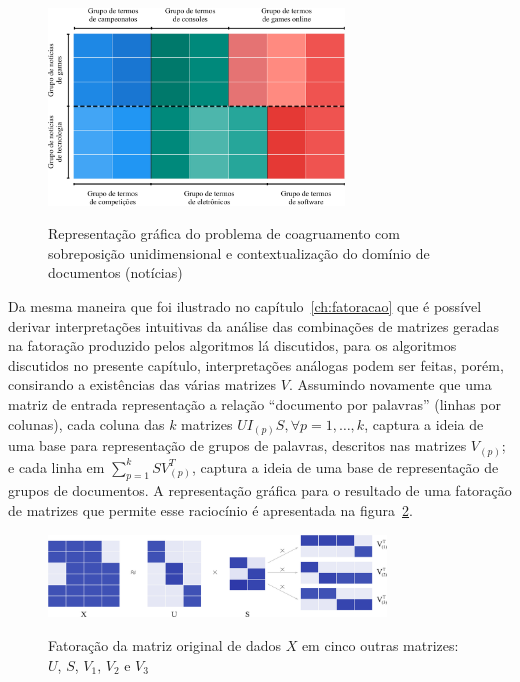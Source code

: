 \documentclass[
    12pt,                %
    oneside,            %
    a4paper,            %
    english,            %
    brazil                %
    ]{abntex2ppgsi}
\begin{document}

\begin{figure}[H]
\centering
\caption{Representação gráfica do problema de coagruamento com sobreposição unidimensional e contextualização do domínio de documentos (notícias)}
\includegraphics[width=0.7\textwidth]{img/ovnmtfNewsApplication.png}
\label{fig:ovnmtfApplication}
\end{figure}

Da mesma maneira que foi ilustrado no capítulo~\ref{ch:fatoracao} que é possível derivar interpretações intuitivas da análise das combinações de matrizes geradas na fatoração produzido pelos algoritmos lá discutidos, para os algoritmos discutidos no presente capítulo, interpretações análogas podem ser feitas, porém, consirando a existências das várias matrizes $V$.
Assumindo novamente que uma matriz de entrada representação a relação ``documento por palavras'' (linhas por colunas), cada coluna das $k$ matrizes $U I_{(p)} S, \forall p = {1, \dots, k}$, captura a ideia de uma base para representação de grupos de palavras, descritos nas matrizes $V_{(p)}$; e cada linha em $\sum_{p=1}^k S V_{(p)}^T$, captura a ideia de uma base de representação de grupos de documentos.
A representação gráfica para o resultado de uma fatoração de matrizes que permite esse raciocínio é apresentada na figura~\ref{fig:factorizationXUSV1tok}.

\begin{figure}[H]
\centering
\caption{
Fatoração da matriz original de dados $X$ em cinco outras matrizes: $U$, $S$, $V_1$, $V_2$ e $V_3$}
\includegraphics[width=0.8\textwidth]{img/factorizationXUSV1tok.png}
\label{fig:factorizationXUSV1tok}
\end{figure}
\end{document}
